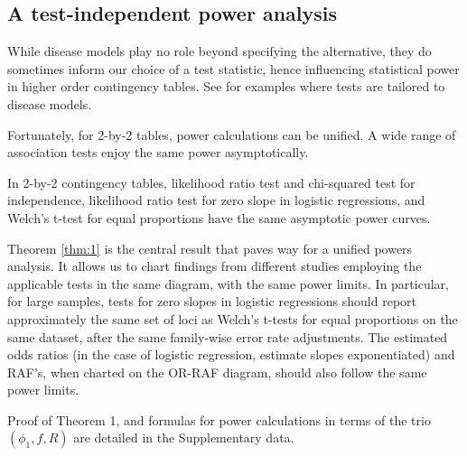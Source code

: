 \subsection{A test-independent power analysis}

While disease models play no role beyond specifying the alternative, they do sometimes inform our choice of a test statistic, hence influencing statistical power in higher order contingency tables.
See \cite{Gonzalez08, Li08} for examples where tests are tailored to disease models. 

Fortunately, for 2-by-2 tables, power calculations can be unified.
A wide range of association tests enjoy the same power asymptotically.
\begin{theorem} \label{thm:1}
In 2-by-2 contingency tables, likelihood ratio test and chi-squared test for independence, likelihood ratio test for zero slope in logistic regressions, and Welch's t-test for equal proportions have the same asymptotic power curves.
\end{theorem}

Theorem \ref{thm:1} is the central result that paves way for a unified powers analysis.
It allows us to chart findings from different studies employing the applicable tests in the same diagram, with the same power limits.
In particular, for large samples, tests for zero slopes in logistic regressions should report approximately the same set of loci as Welch's t-tests for equal proportions on the same dataset, after the same family-wise error rate adjustments.
The estimated odds ratios (in the case of logistic regression, estimate slopes exponentiated) and RAF's, when charted on the OR-RAF diagram, should also follow the same power limits.

Proof of Theorem 1, and formulas for power calculations in terms of the trio $(\phi_1, f, R)$ are detailed in the Supplementary data.

